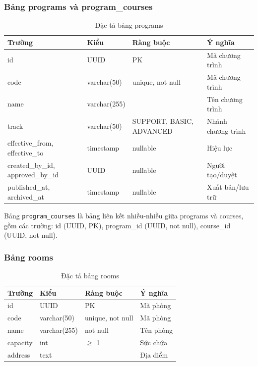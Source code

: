 \documentclass[../DoAn.tex]{subfiles}
\begin{document}
\subsubsection{Bảng programs và program\_courses}
\begin{table}[H]
\centering
\caption{Đặc tả bảng programs}
\scriptsize
\begin{tabular}{|l|l|l|p{4cm}|}
\hline
\textbf{Trường} & \textbf{Kiểu} & \textbf{Ràng buộc} & \textbf{Ý nghĩa} \\ \hline
id & UUID & PK & Mã chương trình \\ \hline
code & varchar(50) & unique, not null & Mã chương trình \\ \hline
name & varchar(255) & & Tên chương trình \\ \hline
track & varchar(50) & SUPPORT, BASIC, ADVANCED & Nhánh chương trình \\ \hline
effective\_from, effective\_to & timestamp & nullable & Hiệu lực \\ \hline
created\_by\_id, approved\_by\_id & UUID & nullable & Người tạo/duyệt \\ \hline
published\_at, archived\_at & timestamp & nullable & Xuất bản/lưu trữ \\ \hline
\end{tabular}
\end{table}

Bảng \texttt{program\_courses} là bảng liên kết nhiều-nhiều giữa programs và courses, gồm các trường: id (UUID, PK), program\_id (UUID, not null), course\_id (UUID, not null).

\subsubsection{Bảng rooms}
\begin{table}[H]
\centering
\caption{Đặc tả bảng rooms}
\scriptsize
\begin{tabular}{|l|l|l|p{4cm}|}
\hline
\textbf{Trường} & \textbf{Kiểu} & \textbf{Ràng buộc} & \textbf{Ý nghĩa} \\ \hline
id & UUID & PK & Mã phòng \\ \hline
code & varchar(50) & unique, not null & Mã phòng \\ \hline
name & varchar(255) & not null & Tên phòng \\ \hline
capacity & int & $\geq$ 1 & Sức chứa \\ \hline
address & text & & Địa điểm \\ \hline
\end{tabular}
\end{table}
\end{document}
